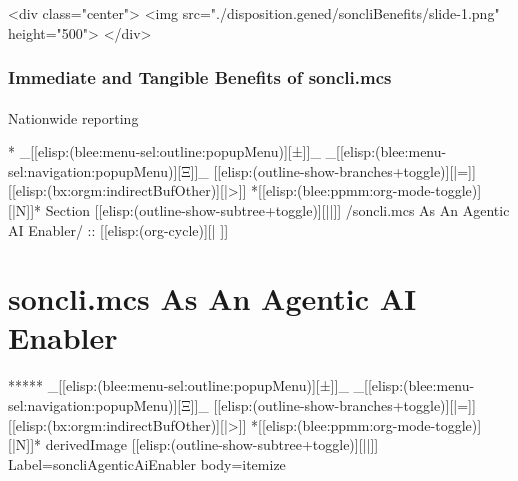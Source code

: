 \begin{whenOrg}
\begin{htmlonly}

\begin{frame}[fragile,plain,label=soncliBenefits]
    \frametitle{}
    \framesubtitle{}
    \begin{rawhtml}
<div class="center">
<img src="./disposition.gened/soncliBenefits/slide-1.png" height="500">
</div>
    \end{rawhtml}
\end{frame}
\end{htmlonly}

\begin{verblatex}

\begin{frame}[fragile,plain,label=soncliBenefits]
    \frametitle{Immediate and Tangible Benefits of soncli.mcs}
    \framesubtitle{}


    Nationwide reporting


\end{frame}
\end{verblatex}




\begin{whenOrg}
*  _[[elisp:(blee:menu-sel:outline:popupMenu)][±]]_ _[[elisp:(blee:menu-sel:navigation:popupMenu)][Ξ]]_ [[elisp:(outline-show-branches+toggle)][|=]] [[elisp:(bx:orgm:indirectBufOther)][|>]] *[[elisp:(blee:ppmm:org-mode-toggle)][|N]]*  Section    [[elisp:(outline-show-subtree+toggle)][||]]   /soncli.mcs As An Agentic AI Enabler/ ::  [[elisp:(org-cycle)][| ]]
\end{whenOrg}

\section{soncli.mcs As An Agentic AI Enabler}


\begin{whenOrg}
*****  _[[elisp:(blee:menu-sel:outline:popupMenu)][±]]_ _[[elisp:(blee:menu-sel:navigation:popupMenu)][Ξ]]_ [[elisp:(outline-show-branches+toggle)][|=]] [[elisp:(bx:orgm:indirectBufOther)][|>]] *[[elisp:(blee:ppmm:org-mode-toggle)][|N]]*  derivedImage [[elisp:(outline-show-subtree+toggle)][||]] Label=soncliAgenticAiEnabler  body=itemize
\end{whenOrg}


\end{whenOrg}
